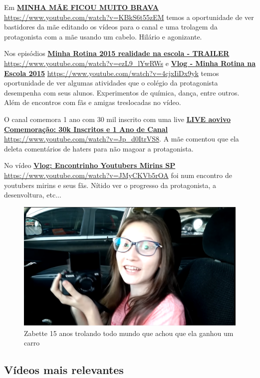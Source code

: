 Em \href{https://www.youtube.com/watch?v=KBkS6t55zEM}{\textbf{MINHA MÃE FICOU MUITO BRAVA }} \url{https://www.youtube.com/watch?v=KBkS6t55zEM} temos a oportunidade de ver bastidores da mãe editando os vídeos para o canal e uma trolagem da protagonista com a mãe usando um cabelo. Hilário e agonizante.

Nos episódios \href{https://www.youtube.com/watch?v=ezL9_lYwRWs}{\textbf{Minha Rotina 2015 realidade na escola - TRAILER}} \url{https://www.youtube.com/watch?v=ezL9_lYwRWs} e \href{https://www.youtube.com/watch?v=4cjxIiDx9yk}{\textbf{Vlog - Minha Rotina na Escola 2015}} \url{https://www.youtube.com/watch?v=4cjxIiDx9yk} temos oportunidade de ver algumas atividades que o colégio da protagonista desempenha com seus alunos. Experimentos de química, dança, entre outros. Além de encontros com fãs e amigas treslocadas no vídeo.

O canal comemora 1 ano com 30 mil inscrito com uma live \href{https://www.youtube.com/watch?v=Jp_d0ItrVS8}{\textbf{LIVE aovivo Comemoração: 30k Inscritos e 1 Ano de Canal}} \url{https://www.youtube.com/watch?v=Jp_d0ItrVS8}. A mãe comentou que ela deleta comentários de haters para não magoar a protagonista.

No vídeo \href{https://www.youtube.com/watch?v=JMyCKVb5rOA}{\textbf{Vlog: Encontrinho Youtubers Mirins SP}} \url{https://www.youtube.com/watch?v=JMyCKVb5rOA} foi num encontro de youtubers mirins e seus fãs. Nítido ver o progresso da protagonista, a desenvoltura, etc...

\begin{figure}[h!]
    \centering
    \includegraphics[width=0.7\linewidth]{fig/Zabetta-15-anos}
    \caption{Zabette 15 anos trolando todo mundo que achou que ela ganhou um carro}
    \label{fig:zabetta-15-anos}
\end{figure}


\subsection{Vídeos mais relevantes}

